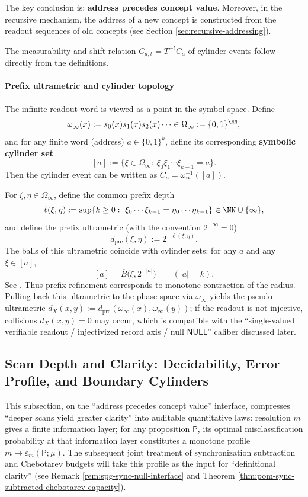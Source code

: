 The key conclusion is: \textbf{address precedes concept value}. Moreover, in the recursive mechanism, the address of a new concept is constructed from the readout sequences of old concepts (see Section \ref{sec:recursive-addressing}).

The measurability and shift relation $C_{a,t}=T^{-t}C_a$ of cylinder events follow directly from the definitions.

\paragraph{Prefix ultrametric and cylinder topology}\label{par:spg-prefix-ultrametric}
The infinite readout word is viewed as a point in the symbol space. Define
\[
\omega_\infty(x):=s_0(x)s_1(x)s_2(x)\cdots\in\Omega_\infty:=\{0,1\}^{\NN},
\]
and for any finite word (address) $a\in\{0,1\}^k$, define its corresponding \textbf{symbolic cylinder set}
\[
[a]:=\{\xi\in\Omega_\infty:\ \xi_0\xi_1\cdots\xi_{k-1}=a\}.
\]
Then the cylinder event can be written as $C_a=\omega_\infty^{-1}([a])$.
\par
For $\xi,\eta\in\Omega_\infty$, define the common prefix depth
\[
\ell(\xi,\eta):=\sup\{k\ge 0:\ \xi_0\cdots\xi_{k-1}=\eta_0\cdots\eta_{k-1}\}\in\NN\cup\{\infty\},
\]
and define the prefix ultrametric (with the convention $2^{-\infty}=0$)
\[
d_{\mathrm{pre}}(\xi,\eta):=2^{-\ell(\xi,\eta)}.
\]
The balls of this ultrametric coincide with cylinder sets: for any $a$ and any $\xi\in[a]$,
\[
[a]=\overline{B}\bigl(\xi,2^{-|a|}\bigr)\qquad(|a|=k).
\]
See \cite{LindMarcus1995}. Thus prefix refinement corresponds to monotone contraction of the radius. Pulling back this ultrametric to the phase space via $\omega_\infty$ yields the pseudo-ultrametric $d_X(x,y):=d_{\mathrm{pre}}(\omega_\infty(x),\omega_\infty(y))$; if the readout is not injective, collisions $d_X(x,y)=0$ may occur, which is compatible with the ``single-valued verifiable readout / injectivized record axis / null $\mathsf{NULL}$'' caliber discussed later.

\subsection{Scan Depth and Clarity: Decidability, Error Profile, and Boundary Cylinders}\label{subsec:spg-scan-clarity}
This subsection, on the ``address precedes concept value'' interface, compresses ``deeper scans yield greater clarity'' into auditable quantitative laws: resolution $m$ gives a finite information layer; for any proposition $\mathsf P$, its optimal misclassification probability at that information layer constitutes a monotone profile $m\mapsto \varepsilon_m(\mathsf P;\mu)$. The subsequent joint treatment of synchronization subtraction and Chebotarev budgets will take this profile as the input for ``definitional clarity'' (see Remark \ref{rem:spg-sync-null-interface} and Theorem \ref{thm:pom-sync-subtracted-chebotarev-capacity}).

